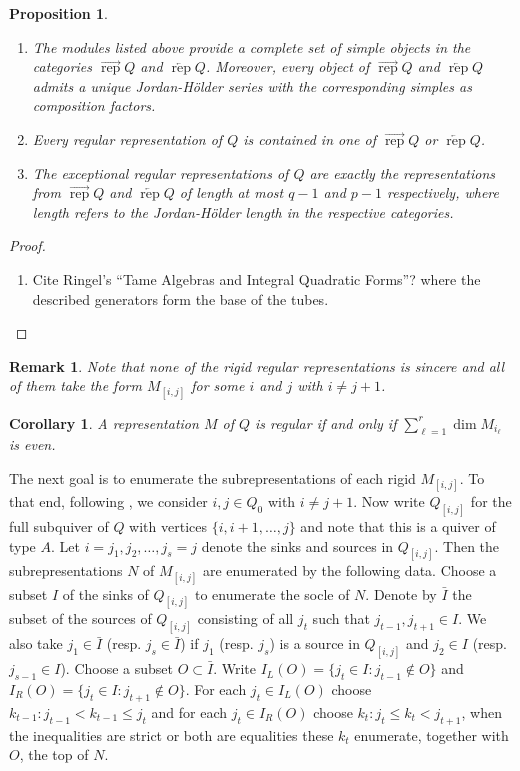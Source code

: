 \documentclass[11pt]{amsart}
\newcommand{\rep}{\operatorname{rep}}
\newtheorem{corollary}[theorem]{Corollary}
\newtheorem{proposition}[theorem]{Proposition}
\newtheorem{remark}[theorem]{Remark}
\numberwithin{equation}{section}
\begin{document}
  \begin{proposition}\mbox{}
    \begin{enumerate}
      \item The modules listed above provide a complete set of simple objects in the categories $\overrightarrow{\rep}Q$ and $\overleftarrow{\rep}Q$.  Moreover, every object of $\overrightarrow{\rep}Q$ and $\overleftarrow{\rep}Q$ admits a unique Jordan-H\"older series with the corresponding simples as composition factors.
      \item Every regular representation of $Q$ is contained in one of $\overrightarrow{\rep}Q$ or $\overleftarrow{\rep}Q$.
      \item The exceptional regular representations of $Q$ are exactly the representations from $\overrightarrow{\rep}Q$ and $\overleftarrow{\rep}Q$ of length at most $q-1$ and $p-1$ respectively, where length refers to the Jordan-H\"older length in the respective categories.  
    \end{enumerate}
  \end{proposition}
  \begin{proof}
    \begin{enumerate}
      \item Cite Ringel's ``Tame Algebras and Integral Quadratic Forms''?  \cite[Theorem 3.6.5]{Rin84} where the described generators form the base of the tubes.
    \end{enumerate}
  \end{proof}
  \begin{remark}\label{rem:rigid regulars}
    Note that none of the rigid regular representations is sincere and all of them take the form $M_{[i,j]}$ for some $i$ and $j$ with $i\ne j+1$.
  \end{remark}

  \begin{corollary}
    A representation $M$ of $Q$ is regular if and only if $\sum\limits_{\ell=1}^r\dim M_{i_\ell}$ is even.
  \end{corollary}

  The next goal is to enumerate the subrepresentations of each rigid $M_{[i,j]}$.  To that end, following , we consider $i,j\in Q_0$ with $i\ne j+1$.  Now write $Q_{[i,j]}$ for the full subquiver of $Q$ with vertices $\{i,i+1,\ldots, j\}$ and note that this is a quiver of type $A$.  Let $i=j_1,j_2,\ldots,j_s=j$ denote the sinks and sources in $Q_{[i,j]}$.  Then the subrepresentations $N$ of $M_{[i,j]}$ are enumerated by the following data.  Choose a subset $I$ of the sinks of $Q_{[i,j]}$ to enumerate the socle of $N$.  Denote by $\bar{I}$ the subset of the sources of $Q_{[i,j]}$ consisting of all $j_t$ such that $j_{t-1},j_{t+1}\in I$.  We also take $j_1\in\bar{I}$ (resp. $j_s\in\bar{I}$) if $j_1$ (resp. $j_s$) is a source in $Q_{[i,j]}$ and $j_2\in I$ (resp. $j_{s-1}\in I$).  Choose a subset $O\subset\bar{I}$.  Write $I_L(O)=\{j_t\in I:j_{t-1}\notin O\}$ and $I_R(O)=\{j_t\in I:j_{t+1}\notin O\}$.  For each $j_t\in I_L(O)$ choose $k_{t-1}:j_{t-1}<k_{t-1}\le j_t$ and for each $j_t\in I_R(O)$ choose $k_t:j_t\le k_t<j_{t+1}$, when the inequalities are strict or both are equalities these $k_t$ enumerate, together with $O$, the top of $N$.
\end{document}
